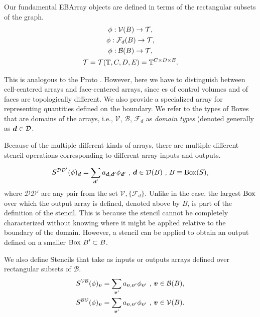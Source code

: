 \documentclass[12pt]{article}
\newcommand{\mcl}[1]{{\mathcal{#1}}}
\newcommand{\MBox}{{\rm{Box}}}
\newcommand{\vof}{{\mbf{v}}}
\newcommand{\dgen}{{\mbf{d}}}
\begin{document}
Our fundamental EBArray objects are defined in terms of the rectangular subsets of the graph.
\begin{gather*}
\phi : \mcl{V}(B) \rightarrow \mcl{T} ,\\
\phi : \mcl{F}_d (B) \rightarrow \mcl{T}, \\
\phi : \mcl{B}(B) \rightarrow \mcl{T}, \\
\mcl{T} = \mcl{T}(\mbb{T},C,D,E) = \mbb{T}^{C \times D \times E}.
\end{gather*}

This is analogous to the Proto . However, here we have to distinguish between cell-centered arrays and face-centered arrays, since es of control volumes and of faces are topologically different. We also provide a specialized array for representing quantities defined on the boundary. We refer to the types of Boxes that are domains of the arrays, i.e., $\mcl{V}$, $\mcl{B}$, $\mcl{F}_d$ as {\it domain types} (denoted generally as $\dgen \in \mcl{D}$.

Because of the multiple different kinds of arrays, there are multiple different stencil operations corresponding to different array inputs and outputs. 

\begin{gather*}
S^{\mcl{D}\mcl{D'}}(\phi)_\dgen = \sum \limits_{\dgen'} a_{\dgen,\dgen'} \phi_{\dgen'} \cma \dgen \in \mcl{D}(B) \cma
B \equiv {\rm Box}(S),
\end{gather*}
where $\mcl{D}\mcl{D}'$ are any pair from the set $\mcl{V},\{ \mcl{F}_d\}.$ Unlike in the  case, the largest $\MBox$ over which the output array is defined, denoted above by $B$, is part of the definition of the stencil. This is because the stencil cannot be completely characterized without knowing where it might be applied relative to the boundary of the domain. However, a stencil can be applied to obtain an output defined on a smaller $\MBox ~ B' \subset B$. 

We also define Stencils that take as inputs or outputs arrays defined over rectangular subsets of $\mcl{B}$.
\begin{gather*}
S^{\mcl{V}\mcl{B}}(\phi)_\vof = \sum \limits_{\vof '} a_{\vof,\vof'} \phi_{\vof'} \cma \vof \in \mcl{B}(B),  \\
S^{\mcl{B}\mcl{V}}(\phi)_\vof = \sum \limits_{\vof '} a_{\vof,\vof'} \phi_{\vof'} \cma \vof \in \mcl{V}(B) .
\end{gather*}
\end{document}
